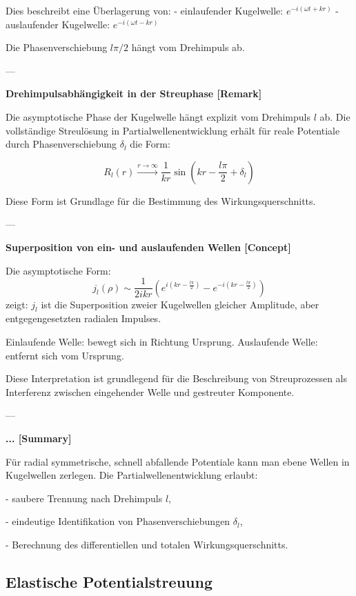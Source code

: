 \documentclass[10pt, letterpaper]{article}
\begin{document}
Dies beschreibt eine Überlagerung von:
- einlaufender Kugelwelle: $e^{-i(\omega t + kr)}$
- auslaufender Kugelwelle: $e^{-i(\omega t - kr)}$

Die Phasenverschiebung $l\pi/2$ hängt vom Drehimpuls ab.

---

\textbf{Drehimpulsabhängigkeit in der Streuphase [Remark]}

Die asymptotische Phase der Kugelwelle hängt explizit vom Drehimpuls $l$ ab. Die vollständige Streulösung in Partialwellenentwicklung erhält für reale Potentiale durch Phasenverschiebung $\delta_l$ die Form:

\[
R_l(r) \xrightarrow{r \to \infty} \frac{1}{kr} \sin \left( kr - \frac{l\pi}{2} + \delta_l \right)
\]

Diese Form ist Grundlage für die Bestimmung des Wirkungsquerschnitts.

---

\textbf{Superposition von ein- und auslaufenden Wellen [Concept]}

Die asymptotische Form:
\[
j_l(\rho) \sim \frac{1}{2ikr} \left( e^{i(kr - \frac{l\pi}{2})} - e^{-i(kr - \frac{l\pi}{2})} \right)
\]
zeigt: $j_l$ ist die Superposition zweier Kugelwellen gleicher Amplitude, aber entgegengesetzten radialen Impulses.

Einlaufende Welle: bewegt sich in Richtung Ursprung.  
Auslaufende Welle: entfernt sich vom Ursprung.

Diese Interpretation ist grundlegend für die Beschreibung von Streuprozessen als Interferenz zwischen eingehender Welle und gestreuter Komponente.

---

\textbf{... [Summary]}

Für radial symmetrische, schnell abfallende Potentiale kann man ebene Wellen in Kugelwellen zerlegen. Die Partialwellenentwicklung erlaubt:

- saubere Trennung nach Drehimpuls $l$,

- eindeutige Identifikation von Phasenverschiebungen $\delta_l$,

- Berechnung des differentiellen und totalen Wirkungsquerschnitts.




\pagebreak


\subsection{Elastische Potentialstreuung}
\end{document}

